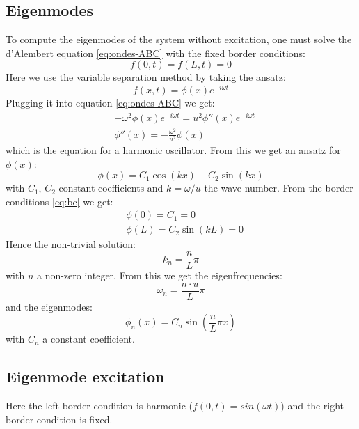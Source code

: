 \documentclass[a4paper,12pt,twoside]{article}
\begin{document}
    \subsection{Eigenmodes}
    To compute the eigenmodes of the system without excitation, one must solve the d'Alembert equation \eqref{eq:ondes-ABC} with the fixed border conditions:
    \begin{equation}
     f(0,t) = f(L,t) = 0
     \label{eq:bc}
    \end{equation}
    Here we use the variable separation method by taking the ansatz:
    \begin{equation*}
     f(x,t) = \phi(x)e^{-i\omega t}
    \end{equation*}
    Plugging it into equation \eqref{eq:ondes-ABC} we get:
    \begin{align*}
     &-\omega^2 \phi(x)e^{-i\omega t} = u^2 \phi''(x)e^{-i\omega t}\\
     &\phi''(x)=-\frac{\omega^2}{u^2}\phi(x)
    \end{align*}
    which is the equation for a harmonic oscillator. From this we get an ansatz for $\phi(x)$:
    \begin{equation*}
     \phi(x)=C_1\cos(kx)+C_2\sin(kx)
    \end{equation*}
    with $C_1$, $C_2$ constant coefficients and $k=\omega/u$ the wave number. From the border conditions \eqref{eq:bc} we get:
    \begin{align*}
     &\phi(0)=C_1=0\\
     &\phi(L)=C_2\sin(kL)=0
    \end{align*}
    Hence the non-trivial solution:
    \begin{equation*}
     k_n=\frac{n}{L}\pi
    \end{equation*}
    with $n$ a non-zero integer. From this we get the eigenfrequencies:
    \begin{equation}
     \boxed{\omega_n = \frac{n\cdot u}{L}\pi}
     \label{eq:eigenfreq}
    \end{equation}
    and the eigenmodes:
    \begin{equation}
     \boxed{\phi_n(x)=C_n\sin\left(\frac{n}{L}\pi x\right)}
     \label{eq:eigenmode}
    \end{equation}
    with $C_n$ a constant coefficient.
    
    \subsection{Eigenmode excitation}
    Here the left border condition is harmonic ($f(0,t)=sin(\omega t)$) and the right border condition is fixed.
    
\end{document}
